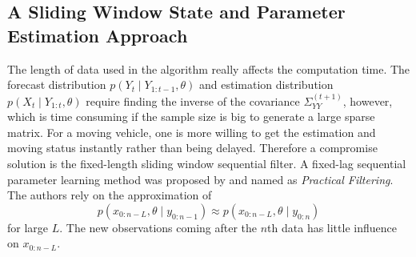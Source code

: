 %

\subsection{A Sliding Window State and Parameter Estimation Approach}

The length of data used in the algorithm really affects the computation time. The forecast distribution $p(Y_{t}\mid Y_{1:t-1},\theta)$ and estimation distribution $p(X_{t}\mid Y_{1:t},\theta)$ require finding the inverse of the covariance $\Sigma_{YY}^{(t+1)}$, however, which is time consuming if the sample size is big to generate a large sparse matrix. For a moving vehicle, one is more willing to get the estimation and moving status instantly rather than being delayed. Therefore a compromise solution is the fixed-length sliding window sequential filter. A fixed-lag sequential parameter learning method was proposed by \cite{polson2008practical} and named as \textit{Practical Filtering}. The authors rely on the approximation of 
\begin{equation}
p(x_{0:n-L},\theta\mid y_{0:n-1}) \approx p(x_{0:n-L},\theta \mid y_{0:n})
\end{equation}
for large $L$. The new observations coming after the $n$th data has little influence on $x_{0:n-L}$. 

